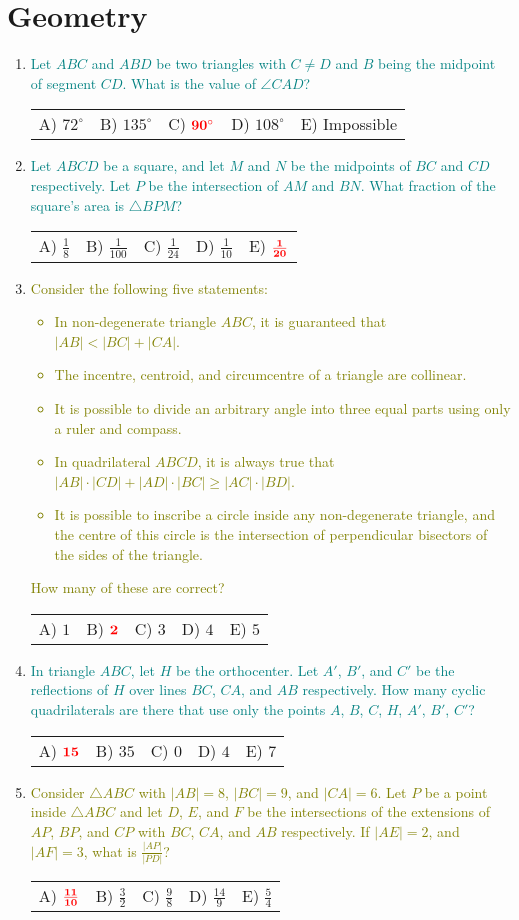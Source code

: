 \documentclass{article}
\newcommand{\answers}[5]{
    \newline
    {
        \centering
        \begin{tabular}{*{5}{p{0.15\textwidth}}}
            A) #1 & B) #2 & C) #3 & D) #4 & E) #5
        \end{tabular}
    }
}
\newcommand{\correct}[1]{
    \mathbf{\textcolor{red}{#1}}
}
\newcommand{\mustintermediate}[1]{
    \textcolor{teal}{#1}
}
\newcommand{\canadvanced}[1]{
    \textcolor{olive}{#1}
}
\begin{document}
\section{Geometry}
\begin{enumerate}[1.]

\item %
\mustintermediate{Let $ABC$ and $ABD$ be two triangles with $C \ne D$ and $B$ being the midpoint of segment $CD$.
What is the value of $\angle CAD$?}
\answers{$72^\circ$}{$135^\circ$}{$\correct{90^\circ}$}{$108^\circ$}{Impossible}


\item %
\mustintermediate{Let $ABCD$ be a square, and let $M$ and $N$ be the midpoints of $BC$ and $CD$ respectively.
Let $P$ be the intersection of $AM$ and $BN$.
What fraction of the square's area is $\triangle BPM$?}
\answers{ $\frac{1}{8}$ }{ $\frac{1}{100}$ }{ $\frac{1}{24}$ }{ $\frac{1}{10}$ }{ $\correct{\frac{1}{20}}$ }


\item %
\canadvanced{Consider the following five statements:
\begin{itemize}
  \item In non-degenerate triangle $ABC$, it is guaranteed that $|AB| < |BC| + |CA|$.
  \item The incentre, centroid, and circumcentre of a triangle are collinear.
  \item It is possible to divide an arbitrary angle into three equal parts using only a ruler and compass.
  \item In quadrilateral $ABCD$, it is always true that $|AB| \cdot |CD| + |AD| \cdot |BC| \ge |AC| \cdot |BD|$.
  \item It is possible to inscribe a circle inside any non-degenerate triangle, and the centre of this circle is the intersection of perpendicular bisectors of the sides of the triangle.
\end{itemize}
How many of these are correct?}
\answers{$1$}{$\correct{2}$}{$3$}{$4$}{$5$}

\item %
\mustintermediate{In triangle $ABC$, let $H$ be the orthocenter.
Let $A'$, $B'$, and $C'$ be the reflections of $H$ over lines $BC$, $CA$, and $AB$ respectively.
How many cyclic quadrilaterals are there that use only the points $A$, $B$, $C$, $H$, $A'$, $B'$, $C'$?}
\answers{$\correct{15}$}{$35$}{$0$}{$4$}{$7$}


\item %
\canadvanced{Consider $\triangle ABC$ with $|AB| = 8$, $|BC| = 9$, and $|CA| = 6$.
Let $P$ be a point inside $\triangle ABC$ and let $D$, $E$, and $F$ be the intersections of the extensions of $AP$, $BP$, and $CP$ with $BC$, $CA$, and $AB$ respectively.
If $|AE| = 2$, and $|AF| = 3$, what is $\frac{|AP|}{|PD|}$?}
\answers{ $\correct{\frac{11}{10}}$ }{ $\frac{3}{2}$ }{ $\frac{9}{8}$ }{ $\frac{14}{9}$ }{ $\frac{5}{4}$ }

\end{enumerate}
\end{document}
